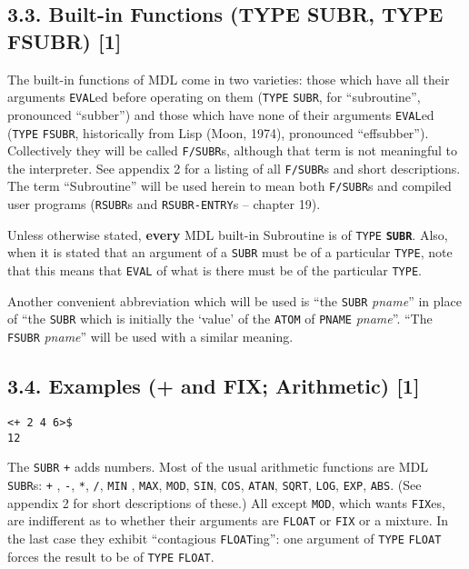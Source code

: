 \documentclass[a4paper,]{article}
\begin{document}
\subsection{3.3. Built-in Functions (TYPE SUBR, TYPE FSUBR) {[}1{]}}\label{built-in-functions-type-subr-type-fsubr-1}

The built-in functions of MDL come in two varieties: those which have all their arguments \texttt{EVAL}ed before operating
on them (\texttt{TYPE} \texttt{SUBR}, for ``subroutine'', pronounced ``subber'') and those
which have none of their arguments \texttt{EVAL}ed (\texttt{TYPE} \texttt{FSUBR}, historically
from Lisp (Moon, 1974), pronounced ``effsubber''). Collectively they will be called \texttt{F/SUBR}s, although that term is
not meaningful to the interpreter. See appendix 2 for a listing of all \texttt{F/SUBR}s and short descriptions. The term
``Subroutine'' will be used herein to mean both \texttt{F/SUBR}s and compiled user programs
(\texttt{RSUBR}s and \texttt{RSUBR-ENTRY}s -- chapter 19).

Unless otherwise stated, \textbf{every} MDL built-in Subroutine is of \texttt{TYPE} \textbf{\texttt{SUBR}}. Also, when it
is stated that an argument of a \texttt{SUBR} must be of a particular \texttt{TYPE}, note that this means that
\texttt{EVAL} of what is there must be of the particular \texttt{TYPE}.

Another convenient abbreviation which will be used is ``the \texttt{SUBR} \emph{pname}'' in place of ``the \texttt{SUBR}
which is initially the `value' of the \texttt{ATOM} of \texttt{PNAME} \emph{pname}''. ``The \texttt{FSUBR} \emph{pname}''
will be used with a similar meaning.

\subsection{3.4. Examples (+ and FIX; Arithmetic) {[}1{]}}\label{examples-and-fix-arithmetic-1}

\begin{verbatim}
<+ 2 4 6>$
12
\end{verbatim}

The \texttt{SUBR} \texttt{+} adds numbers. Most of the usual arithmetic functions are MDL \texttt{SUBR}s: \texttt{+}
,  \texttt{-}, \texttt{*}, 
\texttt{/}, \texttt{MIN} , \texttt{MAX},
\texttt{MOD}, \texttt{SIN}, \texttt{COS},
\texttt{ATAN}, \texttt{SQRT}, \texttt{LOG},
\texttt{EXP}, \texttt{ABS}. (See appendix 2 for short descriptions of
these.) All except \texttt{MOD}, which wants \texttt{FIX}es, are indifferent as to whether their
arguments are \texttt{FLOAT} or \texttt{FIX} or a mixture. In the last case they exhibit ``contagious \texttt{FLOAT}ing'':
one argument of \texttt{TYPE} \texttt{FLOAT} forces the result to be of \texttt{TYPE} \texttt{FLOAT}.
\end{document}
